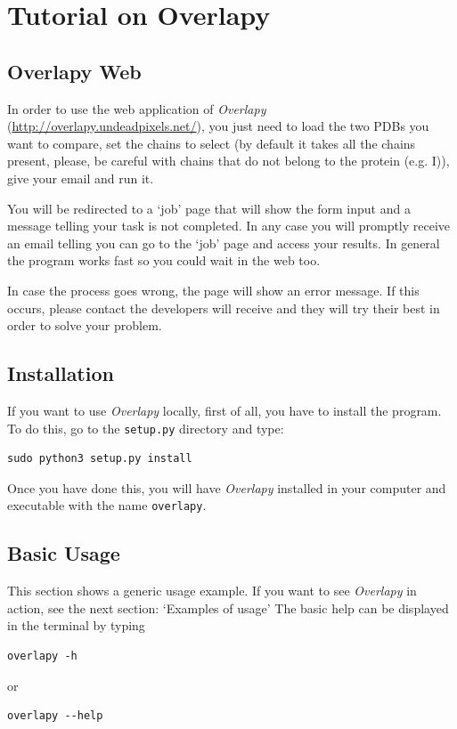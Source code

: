 \documentclass{article}
\begin{document}
\pagebreak
\section*{Tutorial on Overlapy}

\subsection*{\color{gray}Overlapy Web}
In order to use the web application of \textit{Overlapy} (\href{http://overlapy.undeadpixels.net/}{http://overlapy.undeadpixels.net/}), you just need to load the two PDBs you want to compare, set the chains to select (by default it takes all the chains present, please, be careful with chains that do not belong to the protein (e.g. I)), give your email and run it.

You will be redirected to a `job' page that will show the form input and a message telling your task is not completed. In any case you will promptly receive an email telling you can go to the `job' page and access your results. In general the program works fast so you could wait in the web too.

In case the process goes wrong, the page will show an error message. If this occurs, please contact the developers will receive and they will try their best in order to solve your problem.

\subsection*{\color{gray}Installation}
If you want to use \textit{Overlapy} locally, first of all, you have to install the program. To do this, go to the \texttt{setup.py} directory and type:

\lstset{language=bash}
\begin{lstlisting}
sudo python3 setup.py install
\end{lstlisting}

Once you have done this, you will have \textit{Overlapy} installed in your computer and executable with the name \texttt{overlapy}.

\subsection*{\color{gray}Basic Usage}
This section shows a generic usage example. If you want to see \textit{Overlapy} in action, see the next section: `Examples of usage'
The basic help can be displayed in the terminal by typing
\lstset{language=bash}
\begin{lstlisting}
overlapy -h
\end{lstlisting}
or
\lstset{language=bash}
\begin{lstlisting}
overlapy --help
\end{lstlisting}
\end{document}
